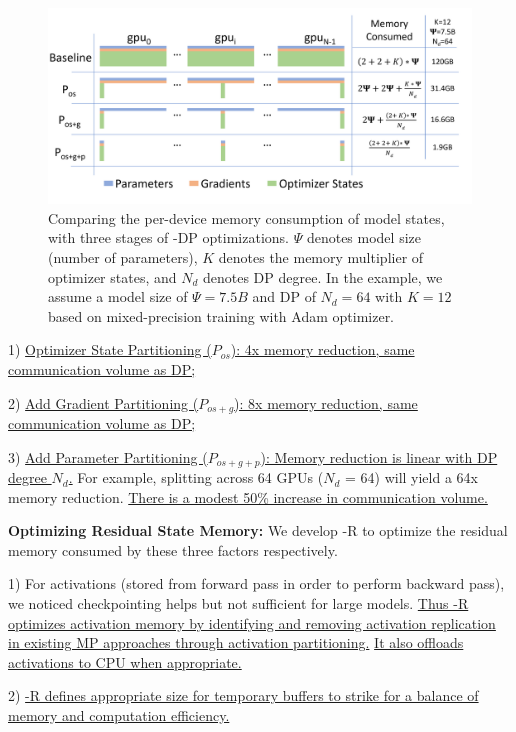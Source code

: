\begin{figure}[t!]
 \begin{center}
 \includegraphics[width=1.0\columnwidth]{memory-consumption-v4.PNG}
 \caption{Comparing the per-device memory consumption of model states, with three stages of \name-DP optimizations. $\Psi$ denotes model size (number of parameters), $K$ denotes the memory multiplier of optimizer states, and $N_d$ denotes DP degree.  In the example, we assume a model size of $\Psi=7.5B$ and DP of $N_d=64$ with $K=12$ based on mixed-precision training with Adam optimizer. } 
 \label{fig:memory-consumption}
 \end{center}
\end{figure}

1) \uline{Optimizer State Partitioning ($P_{os}$): 4x memory reduction, same communication volume as DP;}

2) \uline{Add Gradient Partitioning ($P_{os+g}$): 8x memory reduction, same communication volume as DP;} 

3) \uline{Add Parameter Partitioning ($P_{os+g+p}$): Memory reduction is linear with DP degree $N_d$.} For example, splitting across 64 GPUs ($N_d$ = 64) will yield a 64x memory reduction. \uline{There is a modest 50\% increase in communication volume.}

{\bf Optimizing Residual State Memory:}
We develop \name-R to optimize the residual memory consumed by these three factors respectively.  

1) For activations (stored from forward pass in order to perform backward pass), we noticed checkpointing \cite{DBLP:journals/corr/ChenXZG16} helps but not sufficient for large models.  
\uline{Thus \name-R optimizes activation memory by identifying and removing activation replication in existing MP approaches through activation partitioning.} \uline{It also offloads activations to CPU when appropriate.}

2) \uline{\name-R defines appropriate size for temporary buffers to strike for a balance of memory and computation efficiency.}

